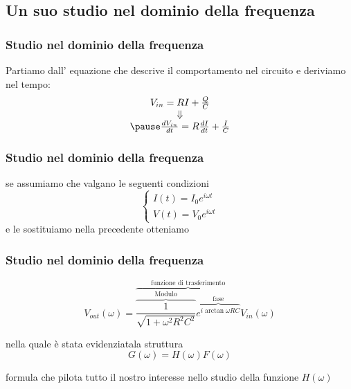 		\subsection{Un suo studio nel dominio della frequenza} %
		\label{sub:un_suo_studio_nel_dominio_della_frequenza}

		\begin{frame}[c]\frametitle{Studio nel dominio della frequenza}
			Partiamo dall' equazione che descrive il comportamento nel circuito e deriviamo nel tempo:
			\begin{equation}
			    \label{eq:Principale}
				\begin{array}{c}
					V_{in}=R I+\frac{Q}{C} \\	
					\Downarrow\\
					\pause
					\frac{dV_{in}}{dt}=R\frac{dI}{dt}+\frac{I}{C}
				\end{array}
			\end{equation}
		    		
		\end{frame}

		\begin{frame}[c]\frametitle{Studio nel dominio della frequenza}
		    se assumiamo che valgano le seguenti condizioni
		    \begin{equation}
				\begin{cases}
						I\left(t\right)= I_0 e^{i \omega t}\\
						V\left(t\right)= V_0 e^{i \omega t}
				\end{cases}
			\end{equation}
			e le sostituiamo nella precedente otteniamo
		\end{frame}

		\begin{frame}[c]\frametitle{Studio nel dominio della frequenza}
		    
		\begin{equation}
			V_{out}\left (\omega \right)=\overbrace{\overbrace{\frac{1}{\sqrt{1 + \omega^2 R^2 C^2}}}^{\mbox{Modulo}}\overbrace{e^{i \arctan{\omega R C}}}^{\mbox{fase}}}^{\mbox{funzione di trasferimento}} V_{in}\left (\omega \right)			
			\end{equation}


			nella quale è stata evidenziatala struttura
			\begin{equation}
			    \label{eq:Trasferimento in omega}
				G\left(\omega\right)=H\left(\omega\right)F\left(\omega\right)
			\end{equation}

			\pause
			formula che pilota tutto il nostro interesse nello studio della funzione $H\left(\omega \right)$
		
		\end{frame}

